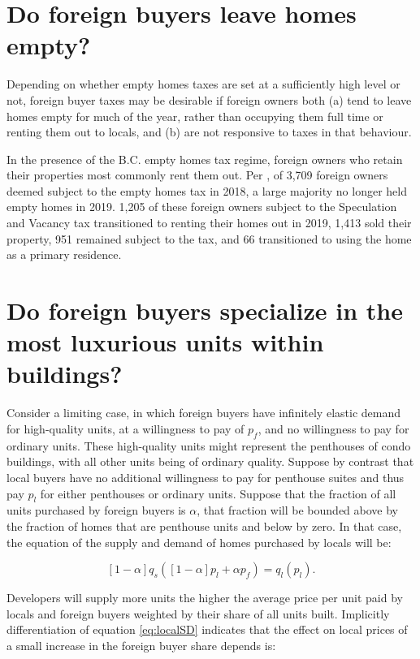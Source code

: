 \documentclass[12pt]{article}
\begin{document}
\section{Do foreign buyers leave homes empty?}

Depending on whether empty homes taxes are set at a sufficiently high level or not, foreign buyer taxes may be desirable if foreign owners both (a) tend to leave homes empty for much of the year, rather than occupying them full time or renting them out to locals, and (b) are not responsive to taxes in that behaviour. 

In the presence of the B.C. empty homes tax regime, foreign owners who retain their
properties most commonly rent them out. Per \textcite{specTax2019}, of 3,709
foreign owners deemed subject to the empty homes tax in 2018, a large majority no
longer held empty homes in 2019. 1,205 of these foreign owners subject to the
Speculation and Vacancy tax transitioned to renting their homes out in 2019,
1,413 sold their property, 951 remained subject to the tax, and 66 transitioned
to using the home as a primary residence. 

\section{Do foreign buyers specialize in the most luxurious units within buildings?}

Consider a limiting case, in which foreign buyers have infinitely elastic demand for high-quality units, at a willingness to pay of $p_{f}$, and no willingness to pay for ordinary units. These high-quality units might represent the penthouses of condo buildings, with all other units being of ordinary quality. Suppose by contrast that local buyers have no additional willingness to pay for penthouse suites and thus pay $p_{l}$ for either penthouses or ordinary units. Suppose that the fraction of all units purchased by foreign buyers is $\alpha$, that fraction will be bounded above by the fraction of homes that are penthouse units and below by zero. In that case, the equation of the supply and demand of homes purchased by locals will be:

\begin{equation}
	\label{eq:localSD}
	\left[1-\alpha\right]q_{s}\left(\left[1-\alpha\right]p_{l} + \alpha p_{f}\right) = q_{l}(p_{l}).
\end{equation}

Developers will supply more units the higher the average price per unit paid by locals and foreign buyers weighted by their share of all units built. Implicitly differentiation of equation \eqref{eq:localSD} indicates that the effect on local prices of a small increase in the foreign buyer share depends is:
\end{document}

